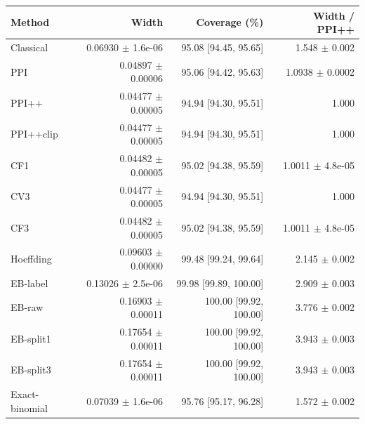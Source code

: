 \small
\begin{tabular}{lrrr}
\toprule
Method & Width & Coverage (\%) & Width / PPI++ \\
\midrule
Classical & 0.06930 $\pm$ 1.6e-06 & 95.08 [94.45, 95.65] & 1.548 $\pm$ 0.002 \\
PPI & 0.04897 $\pm$ 0.00006 & 95.06 [94.42, 95.63] & 1.0938 $\pm$ 0.0002 \\
PPI++ & 0.04477 $\pm$ 0.00005 & 94.94 [94.30, 95.51] & 1.000 \\
PPI++clip & 0.04477 $\pm$ 0.00005 & 94.94 [94.30, 95.51] & 1.000 \\
CF1 & 0.04482 $\pm$ 0.00005 & 95.02 [94.38, 95.59] & 1.0011 $\pm$ 4.8e-05 \\
CV3 & 0.04477 $\pm$ 0.00005 & 94.94 [94.30, 95.51] & 1.000 \\
CF3 & 0.04482 $\pm$ 0.00005 & 95.02 [94.38, 95.59] & 1.0011 $\pm$ 4.8e-05 \\
Hoeffding & 0.09603 $\pm$ 0.00000 & 99.48 [99.24, 99.64] & 2.145 $\pm$ 0.002 \\
EB-label & 0.13026 $\pm$ 2.5e-06 & 99.98 [99.89, 100.00] & 2.909 $\pm$ 0.003 \\
EB-raw & 0.16903 $\pm$ 0.00011 & 100.00 [99.92, 100.00] & 3.776 $\pm$ 0.002 \\
EB-split1 & 0.17654 $\pm$ 0.00011 & 100.00 [99.92, 100.00] & 3.943 $\pm$ 0.003 \\
EB-split3 & 0.17654 $\pm$ 0.00011 & 100.00 [99.92, 100.00] & 3.943 $\pm$ 0.003 \\
Exact-binomial & 0.07039 $\pm$ 1.6e-06 & 95.76 [95.17, 96.28] & 1.572 $\pm$ 0.002 \\
\bottomrule
\end{tabular}
